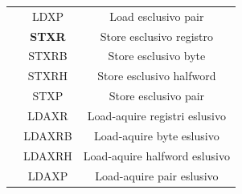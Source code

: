 \documentclass[12pt,a4paper]{article}
\begin{document}
\begin{center}
\begin{tabular}{|c|c|c|}
                                                                                                             & LDXP            & Load esclusivo pair                                                                                       \\ \cline{2-3} 
                                                                                                             & \textbf{STXR}   & Store esclusivo registro                                                                                  \\ \cline{2-3} 
                                                                                                             & STXRB           & Store esclusivo byte                                                                                      \\ \cline{2-3} 
                                                                                                             & STXRH           & Store esclusivo halfword                                                                                  \\ \cline{2-3} 
                                                                                                             & STXP            & Store esclusivo pair                                                                                      \\ \cline{2-3} 
                                                                                                             & LDAXR           & Load-aquire registri eslusivo                                                                             \\ \cline{2-3} 
                                                                                                             & LDAXRB          & Load-aquire byte eslusivo                                                                                 \\ \cline{2-3} 
                                                                                                             & LDAXRH          & Load-aquire halfword eslusivo                                                                             \\ \cline{2-3} 
                                                                                                             & LDAXP           & Load-aquire pair eslusivo                                                                                 \\ \cline{2-3} 

\end{tabular}
\end{center}
\end{document}
